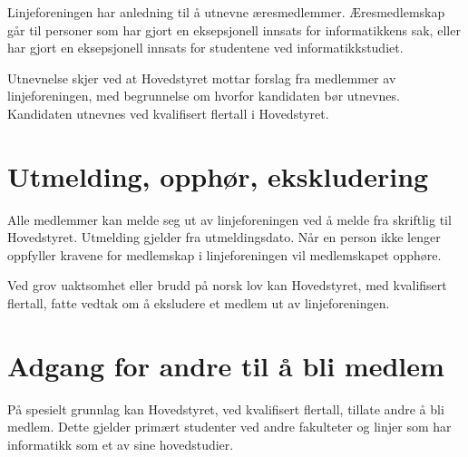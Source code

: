 Linjeforeningen har anledning til å utnevne æresmedlemmer. Æresmedlemskap går \linebreak til personer som har gjort en eksepsjonell innsats for informatikkens sak, eller har gjort en eksepsjonell innsats for studentene ved informatikkstudiet. \newline 


Utnevnelse skjer ved at Hovedstyret mottar forslag fra medlemmer av linjeforeningen, med begrunnelse om hvorfor kandidaten bør utnevnes. Kandidaten utnevnes ved kvalifisert flertall i Hovedstyret.

\section{Utmelding, opphør, ekskludering}
Alle medlemmer kan melde seg ut av linjeforeningen ved å melde fra skriftlig til \mbox{Hovedstyret}. Utmelding gjelder fra utmeldingsdato. Når en person ikke lenger \linebreak oppfyller kravene for medlemskap i linjeforeningen vil medlemskapet opphøre. \newline

Ved grov uaktsomhet eller brudd på norsk lov kan Hovedstyret, med kvalifisert \linebreak flertall, fatte vedtak om å eksludere et medlem ut av linjeforeningen. \newline

\section{Adgang for andre til å bli medlem}

På spesielt grunnlag kan Hovedstyret, ved kvalifisert flertall, tillate andre å bli medlem. Dette gjelder primært studenter ved andre fakulteter og linjer som har informatikk som et av sine hovedstudier. 